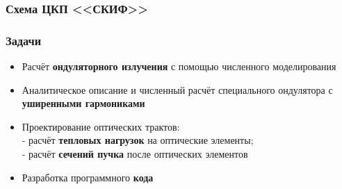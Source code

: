 \documentclass[14pt, hyperref = {colorlinks},xcolor=table ]{beamer}
\begin{document}
\small
\begin{frame}
\frametitle{Схема ЦКП <<СКИФ>>}\label{t1}
\vspace{-10pt}
\begin{figure}[h]
\end{figure}
\end{frame}

\small
\begin{frame}
\frametitle{Задачи}\label{t1}
\begin{center}
\begin{itemize}
	\item Расчёт \textbf{ондуляторного излучения} с помощью численного моделирования \\
  	\item Аналитическое описание и численный расчёт специального ондулятора с \textbf{уширенными гармониками}\\
  	\item Проектирование оптических трактов:\\
  	 - расчёт \textbf{тепловых нагрузок} на оптические элементы;\\
  	 - расчёт \textbf{сечений пучка} после оптических элементов
  	\item Разработка программного \textbf{кода}
\end{itemize}
\end{center}
\end{frame}
\end{document}
